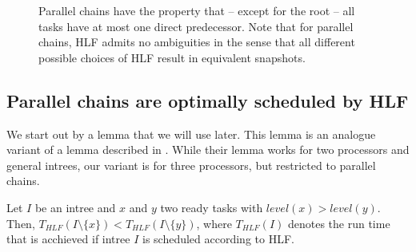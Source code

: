 \begin{figure}[th]
  \centering
  \caption{Parallel chains have the property that -- except for the root -- all tasks have at most one direct predecessor. Note that for parallel chains, HLF admits no ambiguities in the sense that all different possible choices of HLF result in equivalent snapshots.}
  \label{fig:parallel-chain-intro-figure}
\end{figure}

\subsection{Parallel chains are optimally scheduled by HLF}
\label{sec:parallel-chains-optimally-hlf}

We start out by a lemma that we will use later. This lemma is an analogue variant of a lemma described in \cite{chandyreynoldsshortpaper1975}. While their lemma works for two processors and general intrees, our variant is for three processors, but restricted to parallel chains.

\begin{lemma}
  \label{lemma:parallel-chains-flatness}
  Let $I$ be an intree and $x$ and $y$ two ready tasks with $level(x) > level(y)$. Then, $T_{HLF}(I\setminus\{ x \}) < T_{HLF}(I\setminus\{ y \})$, where $T_{HLF}(I)$ denotes the run time that is acchieved if intree $I$ is scheduled according to HLF.
\end{lemma}

